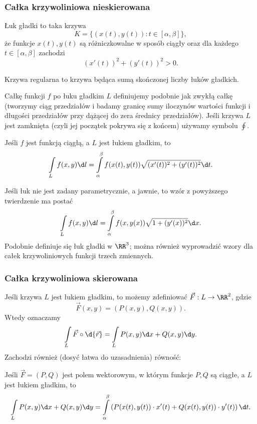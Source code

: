 \subsubsection{Całka krzywoliniowa nieskierowana}
\begin{definition}
    Łuk gładki to taka krzywa
    \[ K = \{(x(t), y(t)) : t \in [\alpha, \beta]\}, \]
    że funkcje $x(t), y(t)$ są różniczkowalne w sposób ciągły oraz dla każdego $t \in [\alpha, \beta]$ zachodzi
    \[ (x'(t))^2 + (y'(t))^2 > 0. \]
\end{definition}

\begin{definition}
    Krzywa regularna to krzywa będąca sumą skończonej liczby łuków gładkich.
\end{definition}

Całkę funkcji $f$ po łuku gładkim $L$ definiujemy podobnie jak zwykłą całkę (tworzymy ciąg przedziałów i badamy granicę sumy iloczynów wartości funkcji i długości przedziałów przy dążącej do zera średnicy przedziałów). Jeśli krzywa $L$ jest zamknięta (czyli jej początek pokrywa się z końcem) używamy symbolu $\oint$.

\begin{theorem}
    Jeśli $f$ jest funkcją ciągłą, a $L$ jest łukiem gładkim, to
    \[ \int\limits_L f(x, y) \d l = \int\limits_\alpha^\beta f(x(t), y(t))\sqrt{(x'(t))^2 + (y'(t))^2} \d t. \]
\end{theorem}

Jeśli łuk nie jest zadany parametrycznie, a jawnie, to wzór z powyższego twierdzenie ma postać
\[ \int\limits_L f(x, y) \d l = \int\limits_\alpha^\beta f(x, y(x))\sqrt{1 + (y'(x))^2} \d x. \]
Podobnie definiuje się łuk gładki w $\RR^3$; można również wyprowadzić wzory dla całek krzywoliniowych funkcji trzech zmiennych.

\subsubsection{Całka krzywoliniowa skierowana}
Jeśli krzywa $L$ jest łukiem gładkim, to możemy zdefiniować  $\vec{F} : L \to \RR^2$, gdzie
\[ \vec{F}(x, y) = (P(x, y), Q(x, y)). \]
Wtedy  oznaczamy
\[ \int\limits_L \vec{F} \circ \d{\vec{r}} = \int\limits_L P(x, y) \d x + Q(x, y) \d y. \]
Zachodzi również (dosyć łatwa do uzasadnienia) równość:

\begin{theorem}
    \label{t:line integral}
    Jeśli $\vec{F} = (P, Q)$ jest polem wektorowym, w którym funkcje $P, Q$  są ciągłe, a $L$ jest łukiem gładkim, to
    \[ \int\limits_L P(x, y) \d x + Q(x, y) \d y = \int\limits_\alpha^\beta \left(P(x(t), y(t))\cdot x'(t) + Q(x(t), y(t))\cdot y'(t)\right) \d t. \]
\end{theorem}

